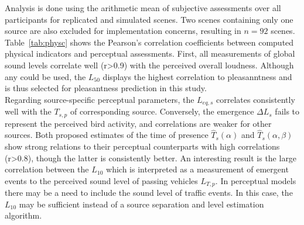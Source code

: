 \documentclass[11pt,a4paper]{article}
\begin{document}
Analysis is done using the arithmetic mean of subjective assessments over all participants for replicated and simulated scenes. Two scenes containing only one source are also excluded for implementation concerns, resulting in $n=92$ scenes.\\

Table~\ref{tab:physc} shows the Pearson's correlation coefficients between computed physical indicators and perceptual assessments. First, all measurements of global sound levels correlate well (r>0.9) with the perceived overall loudness. Although any could be used, the $L_{50}$ displays the highest correlation to pleasanntness and is thus selected for pleasantness prediction in this study.\\

Regarding source-specific perceptual parameters, the $L_{eq, s}$ correlates consistently well with the $T_{s, p}$ of corresponding source. Conversely, the emergence $\Delta L_s$ fails to represent the perceived bird activity, and correlations are weaker for other sources. Both proposed estimates of the time of presence $\hat T_s(\alpha)$ and $\hat T_s(\alpha, \beta)$ show strong relations to their perceptual counterparts with high correlations (r>0.8), though the latter is consistently better. An interesting result is the large correlation between the $L_{10}$ which is interpreted as a measurement of emergent events to the perceived sound level of passing vehicles $L_{T, p}$. In perceptual models there may be a need to include the sound level of traffic events. In this case, the $L_{10}$ may be sufficient instead of a source separation and level estimation algorithm.\\
\end{document}

